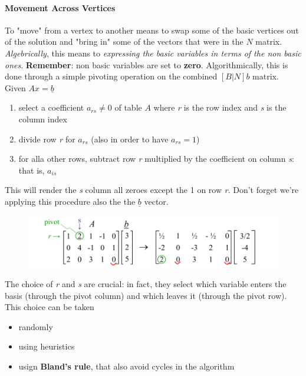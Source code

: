 \documentclass{article}
\begin{document}
				\paragraph{Movement Across Vertices}
					To "move" from a vertex to another means to swap some of the basic vertices out of the solution and "bring in" some of the vectors that were in the $N$ matrix. \textit{Algebrically}, this means to \textit{expressing the basic variables in terms of the non basic ones}. \textbf{Remember}: non basic variables are set to \textbf{zero}. Algorithmically, this is done through a simple pivoting operation on the combined $[B\vert N]b$ matrix.\\
					Given $Ax = \underline{b}$
					\begin{enumerate}
						\item select a coefficient $a_{rs} \neq 0$ of table $A$ where \emph{r} is the row index and \emph{s} is the column index
						\item divide row \emph{r} for $a_{rs}$ (also in order to have $a_{rs} = 1$)
						\item for alla other rows, subtract row \emph{r} multiplied by the coefficient on column \emph{s}: that is, $a_{is}$
					\end{enumerate}
					This will render the \emph{s} column all zeroes except the 1 on row \emph{r}. Don't forget we're applying this procedure also the the $\underline{b}$ vector.
					\begin{figure}[H]
						\centering
						\includegraphics[width = \textwidth]{./images/Simplex1.png}
					\end{figure}
					The choice of \emph{r} and \emph{s} are crucial: in fact, they select which variable enters the basis (through the pivot column) and which leaves it (through the pivot row). This choice can be taken
					\begin{itemize}
						\item randomly
						\item using heuristics
						\item usign \textbf{Bland's rule}, that also avoid cycles in the algorithm
					\end{itemize}
\end{document}
